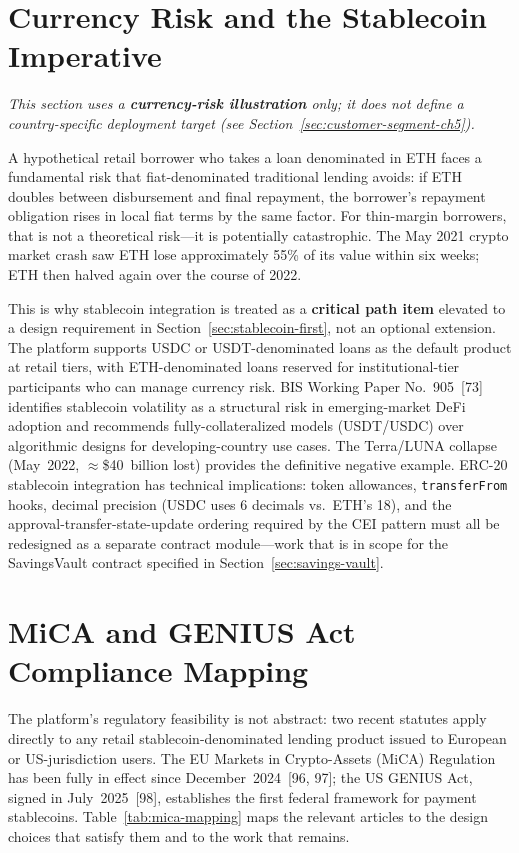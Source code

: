 \documentclass[12pt,a4paper]{report}
\begin{document}
\section{Currency Risk and the Stablecoin Imperative}

\noindent\textit{\small This section uses a \textbf{currency-risk illustration} only; it does not define a country-specific deployment target (see Section~\ref{sec:customer-segment-ch5}).}

A hypothetical retail borrower who takes a loan denominated in ETH faces a fundamental risk that fiat-denominated traditional lending avoids: if ETH doubles between disbursement and final repayment, the borrower's repayment obligation rises in local fiat terms by the same factor. For thin-margin borrowers, that is not a theoretical risk---it is potentially catastrophic. The May 2021 crypto market crash saw ETH lose approximately 55\% of its value within six weeks; ETH then halved again over the course of 2022.

This is why stablecoin integration is treated as a \textbf{critical path item} elevated to a design requirement in Section~\ref{sec:stablecoin-first}, not an optional extension. The platform supports USDC or USDT-denominated loans as the default product at retail tiers, with ETH-denominated loans reserved for institutional-tier participants who can manage currency risk. BIS Working Paper No.~905~[73] identifies stablecoin volatility as a structural risk in emerging-market DeFi adoption and recommends fully-collateralized models (USDT/USDC) over algorithmic designs for developing-country use cases. The Terra/LUNA collapse (May~2022, $\approx$\$40~billion lost) provides the definitive negative example. ERC-20 stablecoin integration has technical implications: token allowances, \texttt{transferFrom} hooks, decimal precision (USDC uses 6 decimals vs.\ ETH's 18), and the approval-transfer-state-update ordering required by the CEI pattern must all be redesigned as a separate contract module---work that is in scope for the SavingsVault contract specified in Section~\ref{sec:savings-vault}.

\section{MiCA and GENIUS Act Compliance Mapping}
\label{sec:mica-compliance}

The platform's regulatory feasibility is not abstract: two recent statutes apply directly to any retail stablecoin-denominated lending product issued to European or US-jurisdiction users. The EU Markets in Crypto-Assets (MiCA) Regulation has been fully in effect since December~2024~[96, 97]; the US GENIUS Act, signed in July~2025~[98], establishes the first federal framework for payment stablecoins. Table~\ref{tab:mica-mapping} maps the relevant articles to the design choices that satisfy them and to the work that remains.
\end{document}
